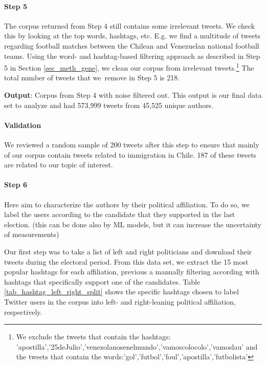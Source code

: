         \paragraph{Step 5} 
        
        The corpus returned from Step 4 still contains some irrelevant tweets. We check this by looking at the top words, hashtags, etc. E.g. we find a multitude of tweets regarding football matches between the Chilean and Venezuelan national football teams. Using the word- and hashtag-based filtering approach as described in Step 5 in Section \ref{sec_meth_gene}, we clean our corpus from irrelevant tweets.\footnote{We exclude the tweets that contain the hashtags: 'apostilla','25deJulio','venezolanosenelmundo','vamoscolocolo','vamoslau' and the tweets that contain the words:'gol','futbol','foul','apostilla','futbolista'} The total number of tweets that we\ remove in Step 5 is 218.
        
        \newline\noindent
        
        \textbf{Output}: Corpus from Step 4 with noise filtered out. This output is our final data set to analyze and had 573,999 tweets from 45,525 unique authors.
        
         \paragraph{Validation}
        We reviewed a random sample of 200 tweets after this step to ensure that mainly of our corpus contain tweets related to immigration in Chile. 187 of these tweets are related to our topic of interest.
        
        
        
        \paragraph{Step 6} 
        
         Here aim to characterize the authors by their political affiliation. To do so, we label the users according to the candidate that they supported in the last election. (this can be done also by ML models, but it can increase the uncertainty of measurements)
        
        Our first step was to take a list of left and right politicians and download their tweets during the electoral period. From this data set, we extract the 15 most popular hashtags for each affiliation, previous a manually filtering according with hashtags that specifically support one of the candidates. Table \ref{tab_hashtag_left_right_split} shows the specific hashtags chosen to label Twitter users in the corpus into left- and right-leaning political affiliation, respectively.
        
